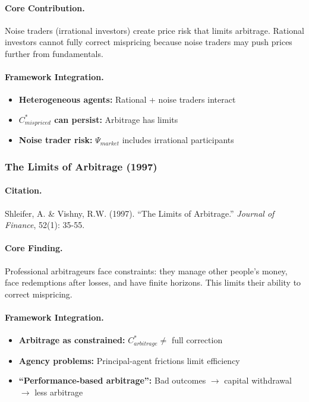 \documentclass[12pt,a4paper]{article}
\begin{document}
\paragraph{Core Contribution.}
Noise traders (irrational investors) create price risk that limits
arbitrage. Rational investors cannot fully correct mispricing because
noise traders may push prices further from fundamentals.

\paragraph{Framework Integration.}
\begin{itemize}
  \item \textbf{Heterogeneous agents:} Rational + noise traders interact
  \item \textbf{$C^*_{mispriced}$ can persist:} Arbitrage has limits
  \item \textbf{Noise trader risk:} $\Psi_{market}$ includes irrational participants
\end{itemize}

\subsubsection{The Limits of Arbitrage (1997)}

\paragraph{Citation.}
Shleifer, A. \& Vishny, R.W. (1997).
``The Limits of Arbitrage.'' \emph{Journal of Finance}, 52(1): 35-55.

\paragraph{Core Finding.}
Professional arbitrageurs face constraints: they manage other people's money,
face redemptions after losses, and have finite horizons. This limits their
ability to correct mispricing.

\paragraph{Framework Integration.}
\begin{itemize}
  \item \textbf{Arbitrage as constrained:} $C^*_{arbitrage} \neq$ full correction
  \item \textbf{Agency problems:} Principal-agent frictions limit efficiency
  \item \textbf{``Performance-based arbitrage'':} Bad outcomes $\to$ capital withdrawal $\to$ less arbitrage
\end{itemize}
\end{document}

